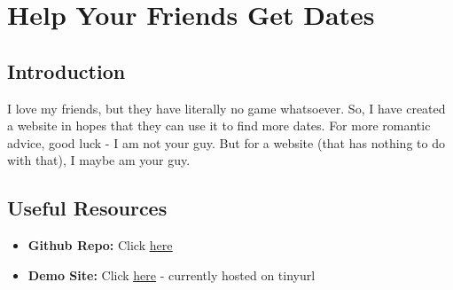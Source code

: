 \section{Help Your Friends Get Dates}
\subsection{Introduction}
I love my friends, but they have literally no game whatsoever. So, I have created a website in hopes that they can use it to find more dates.
For more romantic advice, good luck - I am not your guy. But for a website (that has nothing to do with that), I maybe am your guy.
\subsection{Useful Resources}
\begin{itemize}
    \item \textbf{Github Repo:} Click \href{https://github.com/connorli18/helpyourfriendsgetdates?tab=readme-ov-file}{\underline{here}}
    \item \textbf{Demo Site:} Click \href{https://helpyourfriendsgetdates.tiiny.site/}{\underline{here}} - currently hosted on tinyurl
\end{itemize}